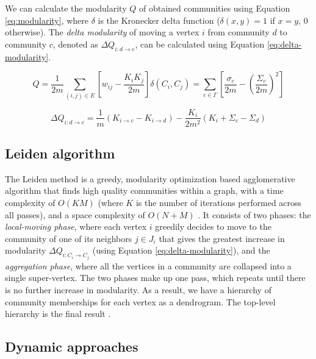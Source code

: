 We can calculate the modularity $Q$ of obtained communities using Equation \ref{eq:modularity}, where $\delta$ is the Kronecker delta function ($\delta (x,y)=1$ if $x=y$, $0$ otherwise). The \textit{delta modularity} of moving a vertex $i$ from community $d$ to community $c$, denoted as $\Delta Q_{i: d \rightarrow c}$, can be calculated using Equation \ref{eq:delta-modularity}.

\begin{equation}
\label{eq:modularity}
  Q
  = \frac{1}{2m} \sum_{(i, j) \in E} \left[w_{ij} - \frac{K_i K_j}{2m}\right] \delta(C_i, C_j)
  = \sum_{c \in \Gamma} \left[\frac{\sigma_c}{2m} - \left(\frac{\Sigma_c}{2m}\right)^2\right]
\end{equation}

\begin{equation}
\label{eq:delta-modularity}
  \Delta Q_{i: d \rightarrow c}
  = \frac{1}{m} (K_{i \rightarrow c} - K_{i \rightarrow d}) - \frac{K_i}{2m^2} (K_i + \Sigma_c - \Sigma_d)
\end{equation}




\subsection{Leiden algorithm}
\label{sec:about-leiden}

The Leiden method is a greedy, modularity optimization based agglomerative algorithm that finds high quality communities within a graph, with a time complexity of $O (KM)$ (where $K$ is the number of iterations performed across all passes), and a space complexity of $O(N + M)$ \cite{com-lancichinetti09}. It consists of two phases: the \textit{local-moving phase}, where each vertex $i$ greedily decides to move to the community of one of its neighbors $j \in J_i$ that gives the greatest increase in modularity $\Delta Q_{i:C_i \rightarrow C_j}$ (using Equation \ref{eq:delta-modularity}), and the \textit{aggregation phase}, where all the vertices in a community are collapsed into a single super-vertex. The two phases make up one pass, which repeats until there is no further increase in modularity. As a result, we have a hierarchy of community memberships for each vertex as a dendrogram. The top-level hierarchy is the final result \cite{com-leskovec21}.




\subsection{Dynamic approaches}
\label{sec:dynamic-graphs}

